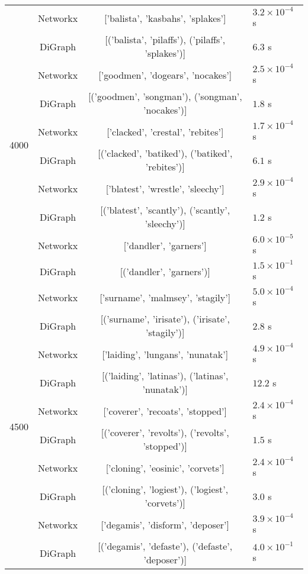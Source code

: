 \documentclass{article}[12 pt]
\begin{document}
\begin{center}
\begin{tabular}{ |c|c|c|l| }
			\multirow{10}{*}{4000} & Networkx & ['balista', 'kasbahs', 'splakes'] & $3.2\times 10^{-4}$ s\\
			& DiGraph & [('balista', 'pilaffs'), ('pilaffs', 'splakes')] & $6.3$ s\\
			& Networkx & ['goodmen', 'dogears', 'nocakes']  & $2.5\times 10^{-4}$ s\\
			& DiGraph & [('goodmen', 'songman'), ('songman', 'nocakes')] & $1.8$ s\\
			& Networkx & ['clacked', 'crestal', 'rebites'] & $1.7\times 10^{-4}$ s\\
			& DiGraph & [('clacked', 'batiked'), ('batiked', 'rebites')] & $6.1$ s\\
			& Networkx & ['blatest', 'wrestle', 'sleechy'] & $2.9\times 10^{-4}$ s\\
			& DiGraph & [('blatest', 'scantly'), ('scantly', 'sleechy')] & $1.2$ s\\
			& Networkx & ['dandler', 'garners'] & $6.0\times 10^{-5}$ s\\
			& DiGraph & [('dandler', 'garners')] & $1.5\times 10^{-1}$ s\\\hline
			
			\multirow{10}{*}{4500} & Networkx & ['surname', 'malmsey', 'stagily'] & $5.0\times 10^{-4}$ s\\
			& DiGraph & [('surname', 'irisate'), ('irisate', 'stagily')] & $2.8$ s\\
			& Networkx & ['laiding', 'lungans', 'nunatak']  & $4.9\times 10^{-4}$ s\\
			& DiGraph & [('laiding', 'latinas'), ('latinas', 'nunatak')] & $12.2$ s\\
			& Networkx & ['coverer', 'recoats', 'stopped'] & $2.4\times 10^{-4}$ s\\
			& DiGraph & [('coverer', 'revolts'), ('revolts', 'stopped')] & $1.5$ s\\
			& Networkx & ['cloning', 'eosinic', 'corvets']  & $2.4\times 10^{-4}$ s\\
			& DiGraph & [('cloning', 'logiest'), ('logiest', 'corvets')] & $3.0$ s\\
			& Networkx & ['degamis', 'disform', 'deposer'] & $3.9\times 10^{-4}$ s\\
			& DiGraph & [('degamis', 'defaste'), ('defaste', 'deposer')] & $4.0\times 10^{-1}$ s\\\hline
			

\end{tabular}
\end{center}
\end{document}
